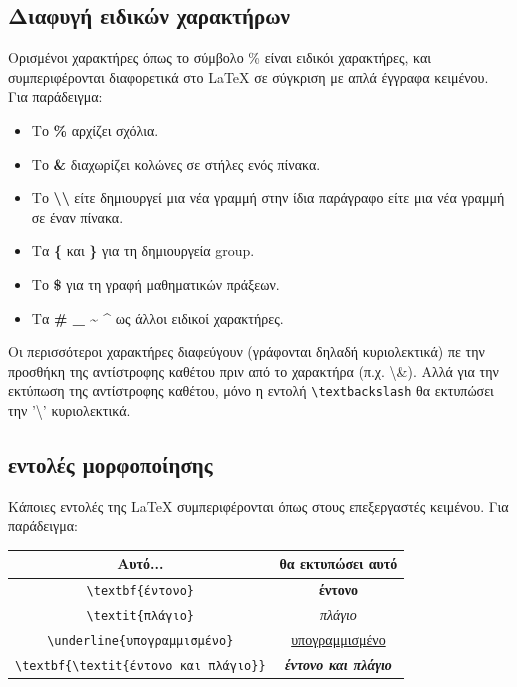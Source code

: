 \documentclass[inscr,ack,preface]{dimscthesis}
\begin{document}
\subsection{Διαφυγή ειδικών χαρακτήρων} \label{escaping}
Ορισμένοι χαρακτήρες όπως το σύμβολο \% είναι ειδικόι χαρακτήρες, και συμπεριφέρονται διαφορετικά στο \LaTeX{} σε σύγκριση με απλά έγγραφα κειμένου.
Για παράδειγμα:
\begin{itemize}
    \item Το \textbf{\%} αρχίζει σχόλια.
    \item Το \textbf{\&} διαχωρίζει κολώνες σε στήλες ενός πίνακα.
    \item Το \textbf{\textbackslash\textbackslash} είτε δημιουργεί μια νέα γραμμή στην ίδια παράγραφο είτε μια νέα γραμμή σε έναν πίνακα.
    \item Τα \textbf{\{} και \textbf{\}} για τη δημιουργεία group.
    \item Το \textbf{\$} για τη γραφή μαθηματικών πράξεων.
    \item Τα \textbf{\# \_ \~{} \^{}} ως άλλοι ειδικοί χαρακτήρες.
\end{itemize}

Οι περισσότεροι χαρακτήρες διαφεύγουν (γράφονται δηλαδή κυριολεκτικά) πε την προσθήκη της αντίστροφης καθέτου πριν από το χαρακτήρα (π.χ. \textbackslash\&).
Αλλά για την εκτύπωση της αντίστροφης καθέτου, μόνο η εντολή \verb|\textbackslash| θα εκτυπώσει την '\textbackslash' κυριολεκτικά.

\subsection{εντολές μορφοποίησης} \label{formatting_commands}

Κάποιες εντολές της \LaTeX{} συμπεριφέρονται όπως στους επεξεργαστές κειμένου.
Για παράδειγμα:

\begin{center}
    \begin{tabular}{c|c}
        Αυτό... & θα εκτυπώσει αυτό \\
        \hline
        \verb|\textbf{έντονο}| & \textbf{έντονο} \\
        \verb|\textit{πλάγιο}| & \textit{πλάγιο} \\
        \verb|\underline{υπογραμμισμένο}| & \underline{υπογραμμισμένο} \\
        \verb|\textbf{\textit{έντονο και πλάγιο}}| & \textbf{\textit{έντονο και πλάγιο}}
    \end{tabular}
\end{center}
\end{document}

